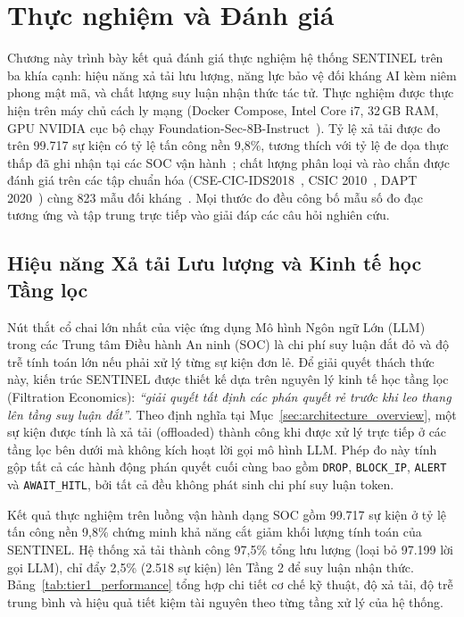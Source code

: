 \chapter{Thực nghiệm và Đánh giá}
\label{ch:experiments_evaluation}

Chương này trình bày kết quả đánh giá thực nghiệm hệ thống SENTINEL trên ba khía cạnh: hiệu năng xả tải lưu lượng, năng lực bảo vệ đối kháng AI kèm niêm phong mật mã, và chất lượng suy luận nhận thức tác tử. Thực nghiệm được thực hiện trên máy chủ cách ly mạng (Docker Compose, Intel Core i7, 32\,GB RAM, GPU NVIDIA cục bộ chạy Foundation-Sec-8B-Instruct~\cite{foundation_sec_instruct}). Tỷ lệ xả tải được đo trên 99.717 sự kiện có tỷ lệ tấn công nền 9,8\%, tương thích với tỷ lệ đe dọa thực thấp đã ghi nhận tại các SOC vận hành~\cite{alahmadi2022}; chất lượng phân loại và rào chắn được đánh giá trên các tập chuẩn hóa (CSE-CIC-IDS2018~\cite{ids2018}, CSIC 2010~\cite{csic2010}, DAPT 2020~\cite{dapt2020}) cùng 823 mẫu đối kháng~\cite{advbench2023, deepset2023, jackhhao2023, shen2024dan}. Mọi thước đo đều công bố mẫu số đo đạc tương ứng và tập trung trực tiếp vào giải đáp các câu hỏi nghiên cứu.

\section{Hiệu năng Xả tải Lưu lượng và Kinh tế học Tầng lọc}
\label{sec:tier1_performance}

Nút thắt cổ chai lớn nhất của việc ứng dụng Mô hình Ngôn ngữ Lớn (LLM) trong các Trung tâm Điều hành An ninh (SOC) là chi phí suy luận đắt đỏ và độ trễ tính toán lớn nếu phải xử lý từng sự kiện đơn lẻ. Để giải quyết thách thức này, kiến trúc SENTINEL được thiết kế dựa trên nguyên lý kinh tế học tầng lọc (Filtration Economics): \textit{``giải quyết tất định các phán quyết rẻ trước khi leo thang lên tầng suy luận đắt''}. Theo định nghĩa tại Mục~\ref{sec:architecture_overview}, một sự kiện được tính là xả tải (offloaded) thành công khi được xử lý trực tiếp ở các tầng lọc bên dưới mà không kích hoạt lời gọi mô hình LLM. Phép đo này tính gộp tất cả các hành động phán quyết cuối cùng bao gồm \texttt{DROP}, \texttt{BLOCK\_IP}, \texttt{ALERT} và \texttt{AWAIT\_HITL}, bởi tất cả đều không phát sinh chi phí suy luận token.

Kết quả thực nghiệm trên luồng vận hành dạng SOC gồm 99.717 sự kiện ở tỷ lệ tấn công nền 9,8\% chứng minh khả năng cắt giảm khối lượng tính toán của SENTINEL. Hệ thống xả tải thành công 97,5\% tổng lưu lượng (loại bỏ 97.199 lời gọi LLM), chỉ đẩy 2,5\% (2.518 sự kiện) lên Tầng 2 để suy luận nhận thức. Bảng~\ref{tab:tier1_performance} tổng hợp chi tiết cơ chế kỹ thuật, độ xả tải, độ trễ trung bình và hiệu quả tiết kiệm tài nguyên theo từng tầng xử lý của hệ thống.

